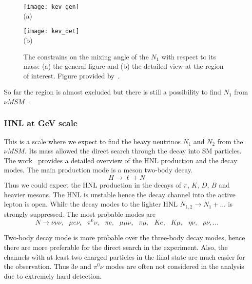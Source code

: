 \documentclass[../main.tex]{subfiles}
\begin{document}
\begin{figure}[!ht]
  \centering
  \begin{minipage}{0.49\linewidth}
    \centering
    \texttt{[image: kev\_gen]} \\ (a)
  \end{minipage}
  \begin{minipage}{0.49\linewidth}
    \centering
    \texttt{[image: kev\_det]} \\ (b)
  \end{minipage}
  \caption{The constrains on the mixing angle of the $N_1$ with respect to its mass: (a) the general figure and (b) the detailed view at the region of interest. Figure provided by~\cite{Perez2017}.}
  \label{fig:intro:hnl_kev}
\end{figure}

So far the region is almost excluded but there is still a possibility to find $N_1$ from $\nu MSM$~\cite{Caputo2020}.

\subsubsection{HNL at GeV scale}
This is a scale where we expect to find the heavy neutrinos $N_1$ and $N_2$ from the $\nu MSM$. Its mass allowed the direct search through the decay into SM particles. The work~\cite{Gorbunov2007} provides a detailed overview of the HNL production and the decay modes. The main production mode is a meson two-body decay.
\begin{equation}
H\to\ell+N
\end{equation}
Thus we could expect the HNL production in the decays of $\pi$, $K$, $D$, $B$ and heavier mesons. The HNL is unstable hence the decay channel into the active lepton is open. While the decay modes to the lighter HNL $N_{1,2}\to N_1+...$ is strongly suppressed. The most probable modes are
\begin{equation}
N\to\overline{\nu}\nu\nu,\text{   } \mu e\nu, \text{   }\pi^0\nu, \text{   }\pi e, \text{   }\mu\mu\nu, \text{   }\pi\mu, \text{   }Ke,\text{   } K\mu,\text{   } \eta\nu, \text{   }\rho\nu,...
\end{equation}

Two-body decay mode is more probable over the three-body decay modes, hence there are more preferable for the direct search in the experiment. Also, the channels with at least two charged particles in the final state are much easier for the observation. Thus $3\nu$ and $\pi^0\nu$ modes are often not considered in the analysis due to extremely hard detection.
\end{document}
